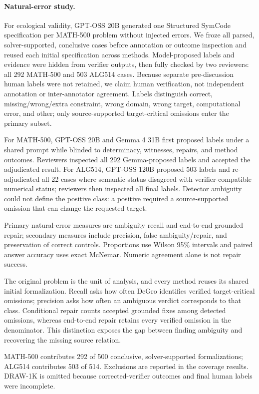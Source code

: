 \documentclass[sigconf,anonymous]{aamas}
\begin{document}
\paragraph{Natural-error study.}
For ecological validity, GPT-OSS 20B generated one Structured SymCode specification per MATH-500 problem without injected errors.  We froze all parsed, solver-supported, conclusive cases before annotation or outcome inspection and reused each initial specification across methods.  Model-proposed labels and evidence were hidden from verifier outputs, then fully checked by two reviewers: all 292 MATH-500 and 503 ALG514 cases.  Because separate pre-discussion human labels were not retained, we claim human verification, not independent annotation or inter-annotator agreement.  Labels distinguish correct, missing/wrong/extra constraint, wrong domain, wrong target, computational error, and other; only source-supported target-critical omissions enter the primary subset.

For MATH-500, GPT-OSS 20B and Gemma 4 31B first proposed labels under a shared prompt while blinded to determinacy, witnesses, repairs, and method outcomes.  Reviewers inspected all 292 Gemma-proposed labels and accepted the adjudicated result.  For ALG514, GPT-OSS 120B proposed 503 labels and re-adjudicated all 22 cases where semantic status disagreed with verifier-compatible numerical status; reviewers then inspected all final labels.  Detector ambiguity could not define the positive class: a positive required a source-supported omission that can change the requested target.

Primary natural-error measures are ambiguity recall and end-to-end grounded repair; secondary measures include precision, false ambiguity/repair, and preservation of correct controls.  Proportions use Wilson 95\% intervals and paired answer accuracy uses exact McNemar.  Numeric agreement alone is not repair success.

The original problem is the unit of analysis, and every method reuses its shared initial formalization.  Recall asks how often DeGro identifies verified target-critical omissions; precision asks how often an ambiguous verdict corresponds to that class.  Conditional repair counts accepted grounded fixes among detected omissions, whereas end-to-end repair retains every verified omission in the denominator.  This distinction exposes the gap between finding ambiguity and recovering the missing source relation.

MATH-500 contributes 292 of 500 conclusive, solver-supported formalizations; ALG514 contributes 503 of 514.  Exclusions are reported in the coverage results.  DRAW-1K is omitted because corrected-verifier outcomes and final human labels were incomplete.
\end{document}
